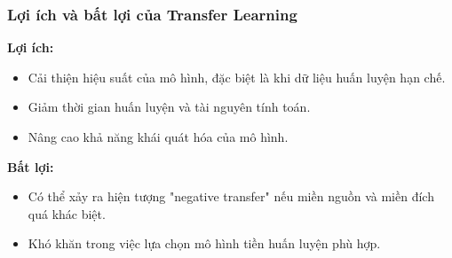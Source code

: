 \subsubsection{Lợi ích và bất lợi của Transfer Learning}

\textbf{Lợi ích:}

\begin{itemize}
    \item Cải thiện hiệu suất của mô hình, đặc biệt là khi dữ liệu huấn luyện hạn chế.
    \item Giảm thời gian huấn luyện và tài nguyên tính toán.
    \item Nâng cao khả năng khái quát hóa của mô hình.
\end{itemize}

\textbf{Bất lợi:}

\begin{itemize}
    \item Có thể xảy ra hiện tượng "negative transfer" nếu miền nguồn và miền đích quá khác biệt.
    \item Khó khăn trong việc lựa chọn mô hình tiền huấn luyện phù hợp.
\end{itemize}
